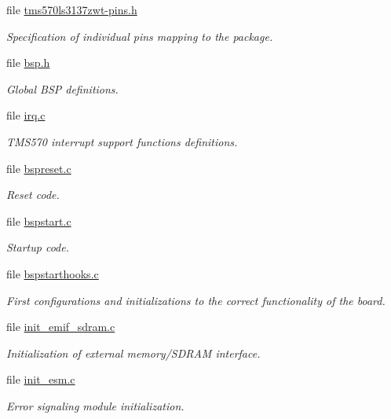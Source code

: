 \begin{DoxyCompactItemize}
file \mbox{\hyperlink{tms570ls3137zwt-pins_8h}{tms570ls3137zwt-\/pins.\+h}}
\begin{DoxyCompactList}\small\item\em Specification of individual pins mapping to the package. \end{DoxyCompactList}\item 
file \mbox{\hyperlink{bsps_2arm_2tms570_2include_2bsp_8h}{bsp.\+h}}
\begin{DoxyCompactList}\small\item\em Global B\+SP definitions. \end{DoxyCompactList}\item 
file \mbox{\hyperlink{bsps_2arm_2tms570_2irq_2irq_8c}{irq.\+c}}
\begin{DoxyCompactList}\small\item\em T\+M\+S570 interrupt support functions definitions. \end{DoxyCompactList}\item 
file \mbox{\hyperlink{arm_2tms570_2start_2bspreset_8c}{bspreset.\+c}}
\begin{DoxyCompactList}\small\item\em Reset code. \end{DoxyCompactList}\item 
file \mbox{\hyperlink{arm_2tms570_2start_2bspstart_8c}{bspstart.\+c}}
\begin{DoxyCompactList}\small\item\em Startup code. \end{DoxyCompactList}\item 
file \mbox{\hyperlink{tms570_2start_2bspstarthooks_8c}{bspstarthooks.\+c}}
\begin{DoxyCompactList}\small\item\em First configurations and initializations to the correct functionality of the board. \end{DoxyCompactList}\item 
file \mbox{\hyperlink{init__emif__sdram_8c}{init\+\_\+emif\+\_\+sdram.\+c}}
\begin{DoxyCompactList}\small\item\em Initialization of external memory/\+S\+D\+R\+AM interface. \end{DoxyCompactList}\item 
file \mbox{\hyperlink{init__esm_8c}{init\+\_\+esm.\+c}}
\begin{DoxyCompactList}\small\item\em Error signaling module initialization. \end{DoxyCompactList}\item 

\end{DoxyCompactItemize}
